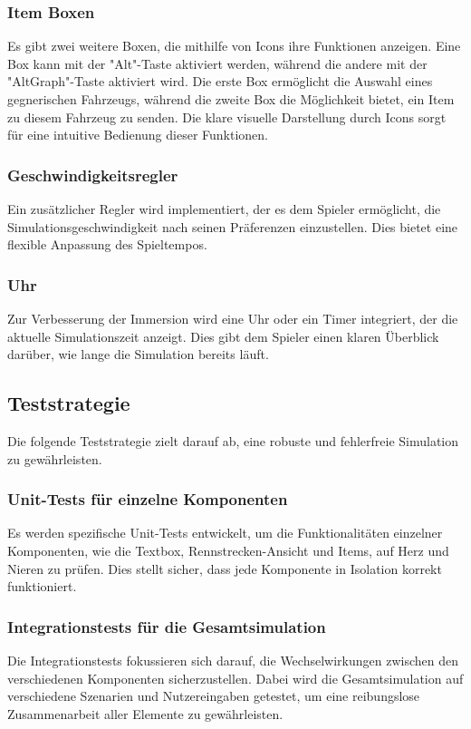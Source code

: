 \documentclass{article}
\begin{document}
\subsubsection{Item Boxen}
Es gibt zwei weitere Boxen, die mithilfe von Icons ihre Funktionen anzeigen. Eine Box kann mit der "Alt"-Taste aktiviert werden, während die andere mit der "AltGraph"-Taste aktiviert wird. Die erste Box ermöglicht die Auswahl eines gegnerischen Fahrzeugs, während die zweite Box die Möglichkeit bietet, ein Item zu diesem Fahrzeug zu senden. Die klare visuelle Darstellung durch Icons sorgt für eine intuitive Bedienung dieser Funktionen.

\subsubsection{Geschwindigkeitsregler}
Ein zusätzlicher Regler wird implementiert, der es dem Spieler ermöglicht, die Simulationsgeschwindigkeit nach seinen Präferenzen einzustellen. Dies bietet eine flexible Anpassung des Spieltempos.

\subsubsection{Uhr}
Zur Verbesserung der Immersion wird eine Uhr oder ein Timer integriert, der die aktuelle Simulationszeit anzeigt. Dies gibt dem Spieler einen klaren Überblick darüber, wie lange die Simulation bereits läuft.

\subsection{Teststrategie}
Die folgende Teststrategie zielt darauf ab, eine robuste und fehlerfreie Simulation zu gewährleisten.

\subsubsection{Unit-Tests für einzelne Komponenten}
Es werden spezifische Unit-Tests entwickelt, um die Funktionalitäten einzelner Komponenten, wie die Textbox, Rennstrecken-Ansicht und Items, auf Herz und Nieren zu prüfen. Dies stellt sicher, dass jede Komponente in Isolation korrekt funktioniert.

\subsubsection{Integrationstests für die Gesamtsimulation}
Die Integrationstests fokussieren sich darauf, die Wechselwirkungen zwischen den verschiedenen Komponenten sicherzustellen. Dabei wird die Gesamtsimulation auf verschiedene Szenarien und Nutzereingaben getestet, um eine reibungslose Zusammenarbeit aller Elemente zu gewährleisten.
\end{document}
